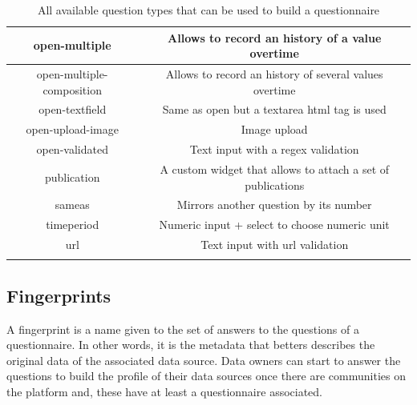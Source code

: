 \begin{longtable}[c]{|c|c|}
open-multiple                     & Allows to record an history of a value overtime             \\ \hline
open-multiple-composition         & Allows to record an history of several values overtime      \\ \hline
open-textfield                    & Same as open but a textarea html tag is used                \\ \hline
open-upload-image                 & Image upload                                                \\ \hline
open-validated                    & Text input with a regex validation                          \\ \hline
publication                       & A custom widget that allows to attach a set of publications \\ \hline
sameas                            & Mirrors another question by its number                      \\ \hline
timeperiod                        & Numeric input + select to choose numeric unit               \\ \hline
url                               & Text input with url validation                              \\ \hline
\caption{All available question types that can be used to build a questionnaire}
\label{tab:original-question-types}\\
\end{longtable}

\subsection{Fingerprints}
\label{sec:fingerprints}


A fingerprint is a name given to the set of answers to the questions of a questionnaire.
In other words, it is the metadata that betters describes the original data of the associated data source.
Data owners can start to answer the questions to build the profile of their data sources once there are communities on the platform and, these have at least a questionnaire associated.

